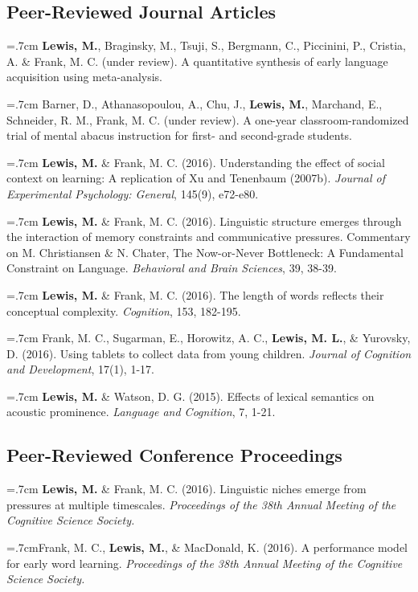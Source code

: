 \documentclass[letterpaper]{article}
\begin{document}
\subsection*{Peer-Reviewed Journal Articles}

\onehalfspacing


  \hangindent=.7cm {\bf Lewis, M.}, Braginsky, M., Tsuji, S., Bergmann, C., Piccinini, P., Cristia, A. \& Frank, M. C. (under review). A quantitative synthesis of early language acquisition using meta-analysis.
  
    \hangindent=.7cm Barner, D., Athanasopoulou, A., Chu, J., {\bf Lewis, M.}, Marchand, E., Schneider, R. M., Frank, M. C. (under review). A one-year classroom-randomized trial of mental abacus instruction for first- and second-grade students.


  \hangindent=.7cm {\bf Lewis, M.} \& Frank, M. C. (2016). Understanding the effect of social context on learning: A replication of Xu and Tenenbaum (2007b). {\it Journal of Experimental Psychology: General}, 145(9), e72-e80.

 \hangindent=.7cm {\bf Lewis, M.} \& Frank, M. C. (2016). Linguistic structure emerges through the interaction of memory constraints and communicative pressures. Commentary on M. Christiansen \& N. Chater, The Now-or-Never Bottleneck: A Fundamental Constraint on Language. {\it Behavioral and Brain Sciences}, 39, 38-39.
 
  \hangindent=.7cm {\bf Lewis, M.} \& Frank, M. C. (2016). The length of words reflects their conceptual complexity. {\it Cognition}, 153, 182-195.

 \hangindent=.7cm Frank, M. C., Sugarman, E., Horowitz, A. C., {\bf Lewis, M. L.}, \& Yurovsky, D. (2016). Using tablets to collect data from young children. {\it Journal of Cognition and Development}, 17(1), 1-17. 
 
  \hangindent=.7cm {\bf Lewis, M.} \& Watson, D. G. (2015). Effects of lexical semantics on acoustic prominence. { \it Language and Cognition}, 7, 1-21. 

  
  \subsection*{Peer-Reviewed Conference Proceedings} 
  \hangindent=.7cm {\bf Lewis, M.} \& Frank, M. C. (2016). Linguistic niches emerge from pressures at multiple timescales. { \it Proceedings of the 38th Annual Meeting of the Cognitive Science Society.}

   \hangindent=.7cmFrank, M. C.,  {\bf Lewis, M.}, \& MacDonald, K. (2016). A performance model for early word learning.  { \it Proceedings of the 38th Annual Meeting of the Cognitive Science Society.}
\end{document}
